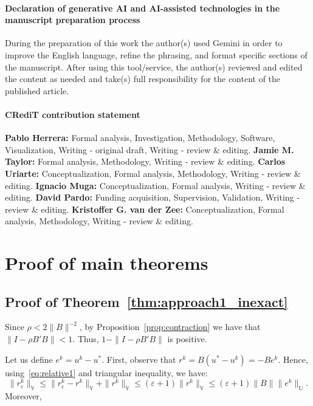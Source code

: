 \documentclass{article}
\theoremstyle{definition}
\begin{document}
\paragraph{Declaration of generative AI and AI-assisted technologies in the manuscript preparation process}
During the preparation of this work the author(s) used Gemini in order to improve the English language, refine the phrasing, and format specific sections of the manuscript. After using this tool/service, the author(s) reviewed and edited the content as needed and take(s) full responsibility for the content of the published article.

\paragraph{CRediT contribution statement}
\textbf{Pablo Herrera:} Formal analysis, Investigation, Methodology, Software, Visualization, Writing - original draft, Writing - review \& editing. \textbf{Jamie M. Taylor:} Formal analysis, Methodology, Writing - review \& editing. \textbf{Carlos Uriarte:} Conceptualization, Formal analysis, Methodology, Writing - review \& editing. \textbf{Ignacio Muga:} Conceptualization, Formal analysis, Writing - review \& editing. \textbf{David Pardo:} Funding acquisition, Supervision, Validation, Writing - review \& editing. \textbf{Kristoffer G. van der Zee:} Conceptualization, Formal analysis, Methodology, Writing - review \& editing.



\pagebreak
\appendix

\section{Proof of main theorems}
\subsection{Proof of Theorem~\ref{thm:approach1_inexact}}
\label{sec:proof_thm1}
Since $\rho<2\|B\|^{-2}$, by Proposition~\ref{prop:contraction} we have that $\|I-\rho B'B\|<1$. Thus, $1-\|I-\rho B'B\|$ is positive.

Let us define $e^k= u^k-u^*$. First, observe that $r^k=B(u^*-u^k)=-Be^k$. Hence, using~\eqref{eq:relative1} and triangular inequality, we have:
\begin{equation}\label{eq:rk}
\|r^k_\varepsilon\|_\mathbb{V} \le 
\|r^k_\varepsilon-r^k\|_\mathbb{V}+\|r^k\|_\mathbb{V}\leq (\varepsilon+1)\|r^k\|_\mathbb{V}\leq (\varepsilon+1)\|B\| \|e^k\|_\mathbb U.
\end{equation}
Moreover,
\end{document}
